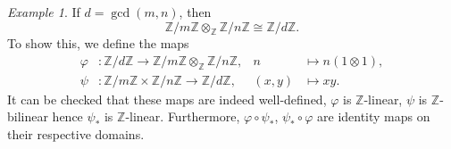 \documentclass[11pt]{article}
\newcommand{\Z}{\mathbb{Z}}
\theoremstyle{definition}
\theoremstyle{remark}
\newtheorem*{example}{Example}
\numberwithin{equation}{section}
\begin{document}
    \begin{example}
        If $d = \gcd(m, n)$, then \[
            \Z/m\Z \otimes_\Z \Z/n\Z \cong \Z/d\Z.
        \] To show this, we define the maps \begin{align*}
            \varphi&\colon \Z/d\Z \to \Z/m\Z\otimes_\Z \Z/n\Z, &n&\mapsto n(1\otimes
            1), \\
            \psi&\colon \Z/m\Z \times \Z/n\Z \to \Z/d\Z, &(x, y)&\mapsto xy.
        \end{align*}
        It can be checked that these maps are indeed well-defined, $\varphi$ is
        $\Z$-linear, $\psi$ is $\Z$-bilinear hence $\psi_*$ is $\Z$-linear.
        Furthermore, $\varphi\circ \psi_*$, $\psi_*\circ\varphi$ are identity maps on
        their respective domains.
    \end{example}
\end{document}
